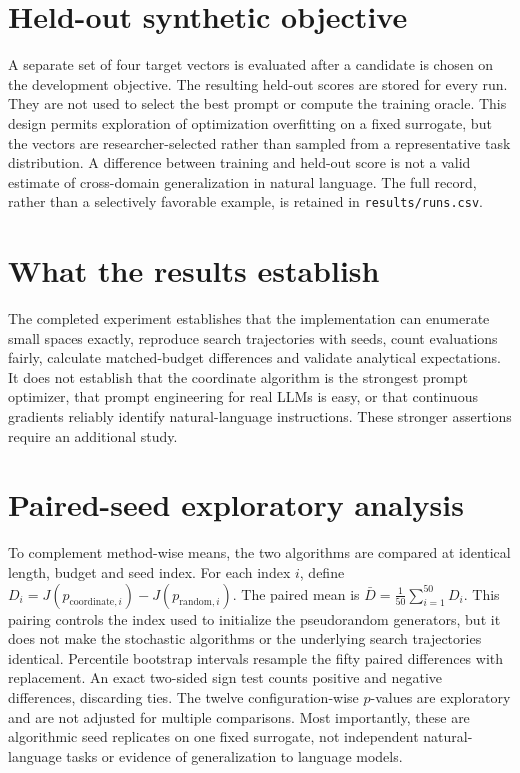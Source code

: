 \documentclass[12pt,a4paper,oneside]{report}
\begin{document}
\section{Held-out synthetic objective}
A separate set of four target vectors is evaluated after a candidate is chosen on the development objective. The resulting held-out scores are stored for every run. They are not used to select the best prompt or compute the training oracle. This design permits exploration of optimization overfitting on a fixed surrogate, but the vectors are researcher-selected rather than sampled from a representative task distribution. A difference between training and held-out score is not a valid estimate of cross-domain generalization in natural language. The full record, rather than a selectively favorable example, is retained in \texttt{results/runs.csv}.

\section{What the results establish}
The completed experiment establishes that the implementation can enumerate small spaces exactly, reproduce search trajectories with seeds, count evaluations fairly, calculate matched-budget differences and validate analytical expectations. It does not establish that the coordinate algorithm is the strongest prompt optimizer, that prompt engineering for real LLMs is easy, or that continuous gradients reliably identify natural-language instructions. These stronger assertions require an additional study.

\section{Paired-seed exploratory analysis}
To complement method-wise means, the two algorithms are compared at identical length, budget and seed index. For each index $i$, define $D_i=J(p_{\mathrm{coordinate},i})-J(p_{\mathrm{random},i})$. The paired mean is $\bar D=\frac1{50}\sum_{i=1}^{50}D_i$. This pairing controls the index used to initialize the pseudorandom generators, but it does not make the stochastic algorithms or the underlying search trajectories identical. Percentile bootstrap intervals resample the fifty paired differences with replacement. An exact two-sided sign test counts positive and negative differences, discarding ties. The twelve configuration-wise $p$-values are exploratory and are not adjusted for multiple comparisons. Most importantly, these are algorithmic seed replicates on one fixed surrogate, not independent natural-language tasks or evidence of generalization to language models.

\end{document}
